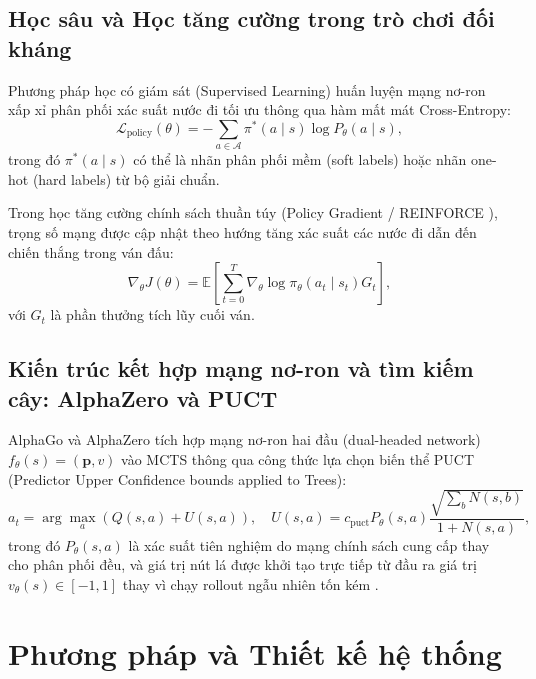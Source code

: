 \documentclass[11pt, a4paper]{article}
\begin{document}
\subsection{Học sâu và Học tăng cường trong trò chơi đối kháng}
Phương pháp học có giám sát (Supervised Learning) huấn luyện mạng nơ-ron xấp xỉ phân phối xác suất nước đi tối ưu thông qua hàm mất mát Cross-Entropy:
\begin{equation}
\mathcal{L}_{\text{policy}}(\theta) = -\sum_{a \in \mathcal{A}} \pi^*(a \mid s) \log P_\theta(a \mid s),
\end{equation}
trong đó $\pi^*(a \mid s)$ có thể là nhãn phân phối mềm (soft labels) hoặc nhãn one-hot (hard labels) từ bộ giải chuẩn.

Trong học tăng cường chính sách thuần túy (Policy Gradient / REINFORCE \cite{sutton2018reinforcement}), trọng số mạng được cập nhật theo hướng tăng xác suất các nước đi dẫn đến chiến thắng trong ván đấu:
\begin{equation}
\nabla_\theta J(\theta) = \mathbb{E} \left[ \sum_{t=0}^T \nabla_\theta \log \pi_\theta(a_t \mid s_t) G_t \right],
\end{equation}
với $G_t$ là phần thưởng tích lũy cuối ván.

\subsection{Kiến trúc kết hợp mạng nơ-ron và tìm kiếm cây: AlphaZero và PUCT}
AlphaGo \cite{silver2016mastering} và AlphaZero \cite{silver2017mastering} tích hợp mạng nơ-ron hai đầu (dual-headed network) $f_\theta(s) = (\mathbf{p}, v)$ vào MCTS thông qua công thức lựa chọn biến thể PUCT (Predictor Upper Confidence bounds applied to Trees):
\begin{equation}
a_t = \arg\max_a \left( Q(s, a) + U(s, a) \right), \quad U(s, a) = c_{\text{puct}} P_\theta(s, a) \frac{\sqrt{\sum_b N(s, b)}}{1 + N(s, a)},
\end{equation}
trong đó $P_\theta(s, a)$ là xác suất tiên nghiệm do mạng chính sách cung cấp thay cho phân phối đều, và giá trị nút lá được khởi tạo trực tiếp từ đầu ra giá trị $v_\theta(s) \in [-1, 1]$ thay vì chạy rollout ngẫu nhiên tốn kém \cite{liu2020alphago}.

\section{Phương pháp và Thiết kế hệ thống}
\end{document}
